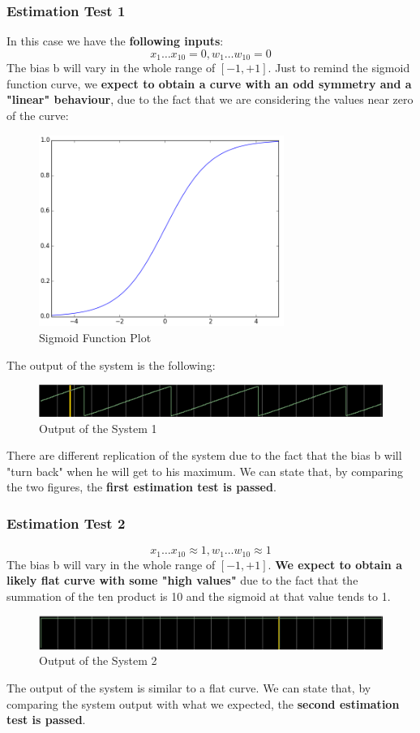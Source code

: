 \subsubsection{Estimation Test 1}
In this case we have the \textbf{following inputs}:
\begin{equation}
	x_{1} \dots x_{10} = 0, w_{1} \dots w_{10} = 0
\end{equation}
The bias b will vary in the whole range of $[-1, +1]$. Just to remind the sigmoid function curve, we \textbf{expect to obtain a curve with an odd symmetry and a "linear" behaviour}, due to the fact that we are considering the values near zero of the curve:
\begin{figure}[H]
	\centering
	\caption{Sigmoid Function Plot}
	\includegraphics[width=8cm]{img/sigmoid.png}
\end{figure}
The output of the system is the following:
\begin{figure}[H]
	\centering
	\caption{Output of the System 1}
	\includegraphics[width=\textwidth]{img/est_test_1.png}
\end{figure}
There are different replication of the system due to the fact that the bias b will "turn back" when he will get to his maximum. We can state that, by comparing the two figures, the \textbf{first estimation test is passed}. 
\subsubsection{Estimation Test 2}
\begin{equation}
	x_{1} \dots x_{10} \approx 1, w_{1} \dots w_{10} \approx 1
\end{equation}
The bias b will vary in the whole range of $[-1, +1]$. \textbf{We expect to obtain a likely flat curve with some "high values"} due to the fact that the summation of the ten product is 10 and the sigmoid at that value tends to 1.
\begin{figure}[H]
	\centering
	\caption{Output of the System 2}
	\includegraphics[width=\textwidth]{img/est_test_2.png}
\end{figure}
The output of the system is similar to a flat curve. We can state that, by comparing the system output with what we expected, the \textbf{second estimation test is passed}.
